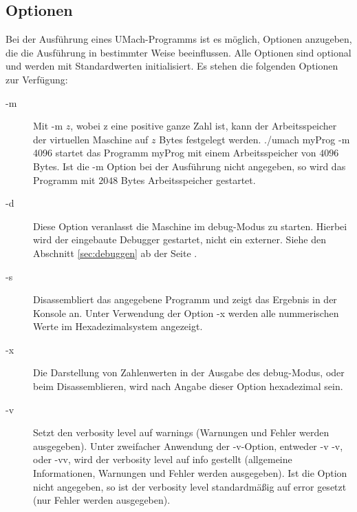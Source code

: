 \subsection{Optionen}
Bei der Ausführung eines UMach-Programms ist es möglich, Optionen anzugeben, die
die Ausführung in bestimmter Weise beeinflussen. Alle Optionen sind optional und
werden mit Standardwerten initialisiert. Es stehen die folgenden Optionen zur Verfügung:
\begin{description}
\item[-m]
Mit \glqq{}-m $z$\grqq{}, wobei \glqq{}z\grqq{} eine positive ganze Zahl ist,
kann der Arbeitsspeicher der virtuellen Maschine auf $z$ Bytes festgelegt
werden. \glqq{}./umach myProg -m 4096\grqq{} startet das Programm
\glqq{}myProg\grqq{} mit einem Arbeitsspeicher von $4096$ Bytes. Ist die
\glqq{}-m\grqq{} Option bei der Ausführung nicht angegeben, so wird das Programm
mit $2048$ Bytes Arbeitsspeicher gestartet.

\item[-d]
Diese Option veranlasst die Maschine im \glqq{}debug\grqq{}-Modus zu starten.
Hierbei wird der eingebaute Debugger gestartet, nicht ein externer.
Siehe den Abschnitt \ref{sec:debuggen} ab der Seite \pageref{sec:debuggen}.

\item[-s]
Disassembliert das angegebene Programm und zeigt das Ergebnis in der Konsole an.
Unter Verwendung der Option -x werden alle nummerischen Werte im
Hexadezimalsystem angezeigt.

\item[-x]
Die Darstellung von Zahlenwerten in der Ausgabe des \glqq{}debug\grqq{}-Modus,
oder beim Disassemblieren, wird nach Angabe dieser Option hexadezimal sein.

\item[-v]
Setzt den \glqq{}verbosity level\grqq{} auf \glqq{}warnings\grqq{} (Warnungen
und Fehler werden ausgegeben). Unter zweifacher Anwendung der
\glqq{}-v\grqq{}-Option, entweder \glqq{}-v -v\grqq{}, oder \glqq{}-vv\grqq{},
wird der \glqq{}verbosity level\grqq{} auf \glqq{}info\grqq{} gestellt
(allgemeine Informationen, Warnungen und Fehler werden ausgegeben). Ist die
Option nicht angegeben, so ist der \glqq{}verbosity level\grqq{} standardmäßig
auf \glqq{}error\grqq{} gesetzt (nur Fehler werden ausgegeben).


\end{description}

